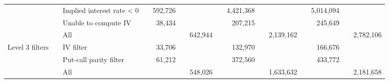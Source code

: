 \begin{tabular}{*{4}{l} *{11}{r} }
				  & & Implied interest rate < 0 & &
				592,726 & &  & &
				4,421,368 & &  & &
				5,014,094 & &  \\
			
				  & & Unable to compute IV & &
				38,434 & &  & &
				207,215 & &  & &
				245,649 & &  \\
			
				  & & All & &
				 & & 642,944 & &
				 & & 2,139,162 & &
				 & & 2,782,106 \\
			
				Level 3 filters & & IV filter & &
				33,706 & &  & &
				132,970 & &  & &
				166,676 & &  \\
			
				  & & Put-call parity filter & &
				61,212 & &  & &
				372,560 & &  & &
				433,772 & &  \\
			
				  & & All & &
				 & & 548,026 & &
				 & & 1,633,632 & &
				 & & 2,181,658 \\
			

	        \hline
	    \end{tabular}
	